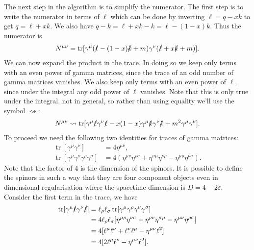 \documentclass[fleqn]{NotesClass}
\newcommand{\minkowskiMetric}{\eta}
\DeclareMathOperator{\tr}{tr}
\begin{document}
    The next step in the algorithm is to simplify the numerator.
    The first step is to write the numerator in terms of \(\ell\) which can be done by inverting \(\ell = q - xk\) to get \(q = \ell + xk\).
    We also have \(q - k = \ell + xk - k = \ell - (1 - x)k\).
    Thus the numerator is
    \begin{equation}
        N^{\mu\nu} = \tr[\gamma^\mu(\slashed{\ell} - (1 - x)\slashed{k} + m)\gamma^\nu(\slashed{\ell} + x\slashed{k} + m)].
    \end{equation}
    We can now expand the product in the trace.
    In doing so we keep only terms with an even power of gamma matrices, since the trace of an odd number of gamma matrices vanishes.
    We also keep only terms with an even power of \(\ell\), since under the integral any odd power of \(\ell\) vanishes.
    Note that this is only true under the integral, not in general, so rather than using equality we'll use the symbol \(\rightsquigarrow\):
    \begin{equation}
        N^{\mu\nu} \rightsquigarrow \tr[\gamma^\mu \slashed{\ell}\gamma^\nu\slashed{\ell} - x(1 - x)\gamma^\mu\slashed{k}\gamma^\nu\slashed{k} + m^2\gamma^\mu\gamma^\nu].
    \end{equation}
    To proceed we need the following two identities for traces of gamma matrices:
    \begin{align}
        \tr[\gamma^\mu \gamma^\nu] &= 4\minkowskiMetric^{\mu\nu},\\
        \tr[\gamma^\mu \gamma^\nu \gamma^\rho \gamma^\sigma] &= 4(\minkowskiMetric^{\mu\nu}\minkowskiMetric^{\rho\sigma} + \minkowskiMetric^{\sigma\mu}\minkowskiMetric^{\nu\rho} - \minkowskiMetric^{\mu\rho}\minkowskiMetric^{\nu\sigma}).
    \end{align}
    Note that the factor of 4 is the dimension of the spinors.
    It is possible to define the spinors in such a way that they are four component objects even in dimensional regularisation where the spacetime dimension is \(D = 4 - 2\varepsilon\).
    Consider the first term in the trace, we have
    \begin{align}
        \tr[\gamma^\mu \slashed{\ell} \gamma^\nu \slashed{\ell}] &= \ell_\rho \ell_\sigma \tr[\gamma^\mu \gamma^\rho \gamma^\nu \gamma^\sigma]\\
        &= 4 \ell_\rho \ell_\sigma [\minkowskiMetric^{\mu\rho} \minkowskiMetric^{\nu\sigma} + \minkowskiMetric^{\rho\nu} \minkowskiMetric^{\sigma\mu} - \minkowskiMetric^{\mu\nu}\minkowskiMetric^{\rho\sigma}]\\
        &= 4 [\ell^\mu \ell^\nu + \ell^\nu \ell^\mu - \minkowskiMetric^{\mu\nu}\ell^2]\\
        &= 4 [2 \ell^\mu \ell^\nu - \minkowskiMetric^{\mu\nu}\ell^2].
    \end{align}
\end{document}
